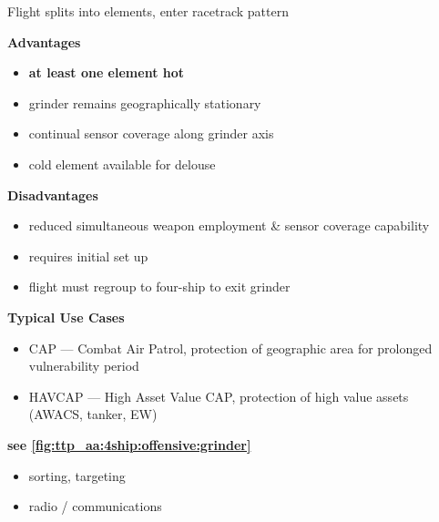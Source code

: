 
\clearpage

\begin{tcoloritemize}
    \blueitem[Grinder]
    Flight splits into elements, enter racetrack pattern

    \bigskip
    \textbf{Advantages}
    \begin{itemize}
        \item \textbf{at least one element hot}
        \item grinder remains geographically stationary
        \item continual sensor coverage along grinder axis
        \item cold element available for delouse
    \end{itemize}

    \textbf{Disadvantages}
    \begin{itemize}
        \item reduced simultaneous weapon employment \& sensor coverage capability
        \item requires initial set up
        \item flight must regroup to four-ship to exit grinder
    \end{itemize}

    \textbf{Typical Use Cases} 
    \begin{itemize}
        \item CAP --- Combat Air Patrol, protection of geographic area for prolonged vulnerability period
        \item HAVCAP --- High Asset Value CAP, protection of high value assets (AWACS, tanker, EW)
    \end{itemize}
    
    \hfill\textbf{see \cref{fig:ttp_aa:4ship:offensive:grinder}}

    \begin{itemize}
        \item sorting, targeting
        \item radio / communications
    \end{itemize}


\end{tcoloritemize}
